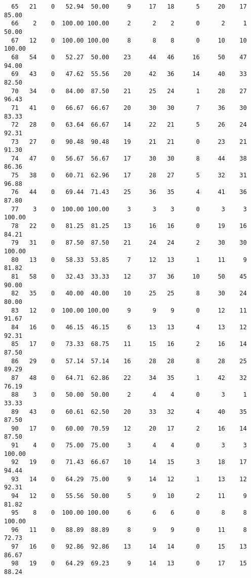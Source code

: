 \begin{verbatim}
  65   21    0   52.94  50.00     9     17   18      5     20    17    85.00
  66    2    0  100.00 100.00     2      2    2      0      2     1    50.00
  67   12    0  100.00 100.00     8      8    8      0     10    10   100.00
  68   54    0   52.27  50.00    23     44   46     16     50    47    94.00
  69   43    0   47.62  55.56    20     42   36     14     40    33    82.50
  70   34    0   84.00  87.50    21     25   24      1     28    27    96.43
  71   41    0   66.67  66.67    20     30   30      7     36    30    83.33
  72   28    0   63.64  66.67    14     22   21      5     26    24    92.31
  73   27    0   90.48  90.48    19     21   21      0     23    21    91.30
  74   47    0   56.67  56.67    17     30   30      8     44    38    86.36
  75   38    0   60.71  62.96    17     28   27      5     32    31    96.88
  76   44    0   69.44  71.43    25     36   35      4     41    36    87.80
  77    3    0  100.00 100.00     3      3    3      0      3     3   100.00
  78   22    0   81.25  81.25    13     16   16      0     19    16    84.21
  79   31    0   87.50  87.50    21     24   24      2     30    30   100.00
  80   13    0   58.33  53.85     7     12   13      1     11     9    81.82
  81   58    0   32.43  33.33    12     37   36     10     50    45    90.00
  82   35    0   40.00  40.00    10     25   25      8     30    24    80.00
  83   12    0  100.00 100.00     9      9    9      0     12    11    91.67
  84   16    0   46.15  46.15     6     13   13      4     13    12    92.31
  85   17    0   73.33  68.75    11     15   16      2     16    14    87.50
  86   29    0   57.14  57.14    16     28   28      8     28    25    89.29
  87   48    0   64.71  62.86    22     34   35      1     42    32    76.19
  88    3    0   50.00  50.00     2      4    4      0      3     1    33.33
  89   43    0   60.61  62.50    20     33   32      4     40    35    87.50
  90   17    0   60.00  70.59    12     20   17      2     16    14    87.50
  91    4    0   75.00  75.00     3      4    4      0      3     3   100.00
  92   19    0   71.43  66.67    10     14   15      3     18    17    94.44
  93   14    0   64.29  75.00     9     14   12      1     13    12    92.31
  94   12    0   55.56  50.00     5      9   10      2     11     9    81.82
  95    8    0  100.00 100.00     6      6    6      0      8     8   100.00
  96   11    0   88.89  88.89     8      9    9      0     11     8    72.73
  97   16    0   92.86  92.86    13     14   14      0     15    13    86.67
  98   19    0   64.29  69.23     9     14   13      0     17    15    88.24

\end{verbatim}

